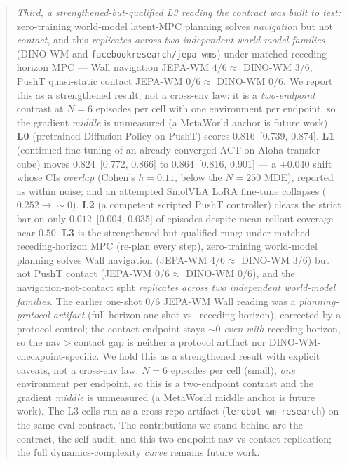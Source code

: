 \documentclass[10pt]{article}
\begin{document}
\begin{abstract}
\emph{Third, a strengthened-but-qualified L3 reading the contract was built
to test:} zero-training world-model latent-MPC planning solves
\emph{navigation} but not \emph{contact}, and this \emph{replicates across
two independent world-model families} (DINO-WM and
\texttt{facebookresearch/jepa-wms}) under matched receding-horizon MPC ---
Wall navigation JEPA-WM $4/6 \approx$ DINO-WM $3/6$, PushT quasi-static
contact JEPA-WM $0/6 \approx$ DINO-WM $0/6$. We report this as a
strengthened result, not a cross-env law: it is a \emph{two-endpoint}
contrast at $N{=}6$ episodes per cell with one environment per endpoint, so
the gradient \emph{middle} is unmeasured (a MetaWorld anchor is future
work). \textbf{L0}
(pretrained Diffusion Policy on PushT) scores $0.816$~[0.739, 0.874].
\textbf{L1} (continued fine-tuning of an already-converged ACT on
Aloha-transfer-cube) moves $0.824$~[0.772, 0.866] to $0.864$~[0.816,
0.901] --- a $+0.040$ shift whose CIs \emph{overlap} (Cohen's $h{=}0.11$,
below the $N{=}250$ MDE), reported as within noise; and an attempted
SmolVLA LoRA fine-tune collapses ($0.252\to{\sim}0$). \textbf{L2} (a
competent scripted PushT controller) clears the strict bar on only
$0.012$~[0.004, 0.035] of episodes despite mean rollout coverage near
$0.50$. \textbf{L3} is the strengthened-but-qualified rung: under matched
receding-horizon MPC (re-plan every step), zero-training world-model
planning solves Wall navigation (JEPA-WM $4/6 \approx$ DINO-WM $3/6$) but
not PushT contact (JEPA-WM $0/6 \approx$ DINO-WM $0/6$), and the
navigation-not-contact split \emph{replicates across two independent
world-model families}. The earlier one-shot $0/6$ JEPA-WM Wall reading was
a \emph{planning-protocol artifact} (full-horizon one-shot vs.\
receding-horizon), corrected by a protocol control; the contact endpoint
stays ${\sim}0$ \emph{even with} receding-horizon, so the nav$>$contact gap
is neither a protocol artifact nor DINO-WM-checkpoint-specific. We hold this
as a strengthened result with explicit caveats, not a cross-env law:
$N{=}6$ episodes per cell (small), \emph{one} environment per endpoint, so
this is a two-endpoint contrast and the gradient \emph{middle} is
unmeasured (a MetaWorld middle anchor is future work). The L3 cells run as a
cross-repo artifact (\texttt{lerobot-wm-research}) on the same eval
contract. The contributions we stand behind are the contract, the
self-audit, and this two-endpoint nav-vs-contact replication; the full
dynamics-complexity \emph{curve} remains future work.
\end{abstract}
\end{document}
